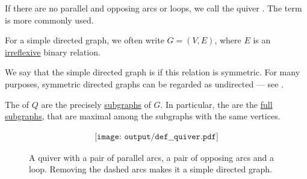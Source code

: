 \begin{definition}
\begin{thmenum}
     If there are no parallel and opposing arcs or loops, we call the quiver . The term  is more commonly used.

    For a simple directed graph, we often write \( G = (V, E) \), where \( E \) is an \hyperref[def:binary_relation/irreflexive]{irreflexive} binary relation.

    We say that the simple directed graph is  if this relation is symmetric. For many purposes, symmetric directed graphs can be regarded as undirected --- see .

     The  of \( Q \) are the precisely \hyperref[def:undirected_multigraph/submodel]{subgraphs} of \( G \). In particular, the  are the \hyperref[def:undirected_multigraph/submodel]{full subgraphs}, that are maximal among the subgraphs with the same vertices.
  \end{thmenum}

  \begin{figure}
    \begin{equation}\label{eq:fig:def:quiver}
      \begin{aligned}
        \texttt{[image: output/def\_\_quiver.pdf]}
      \end{aligned}
    \end{equation}
    \caption{A quiver with a pair of parallel arcs, a pair of opposing arcs and a loop. Removing the dashed arcs makes it a simple directed graph.}\label{fig:def:quiver}
  \end{figure}
\end{definition}


